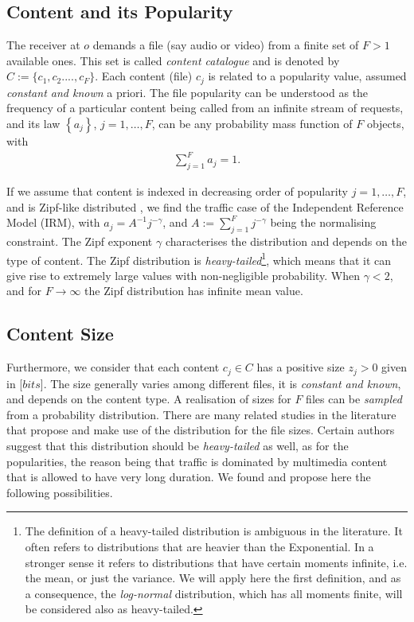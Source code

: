 \documentclass[conference]{IEEEtran}
\begin{document}
\subsection{Content and its Popularity}

The receiver at $o$ demands a file (say audio or video) from a finite set of $F>1$ available ones. This set is called \textit{content catalogue} and is denoted by $\textit{$C$} :=\{c_1,c_2....,c_F\}$. Each content (file) $c_j$ is related to a popularity value, assumed \textit{constant and known} a priori. The file popularity can be understood as the frequency of a particular content being called from an infinite stream of requests, and its law $\left\{a_j\right\}$, $j=1,\ldots,F$, can be any probability mass function of $F$ objects, with
\begin{eqnarray}
\sum_{j=1}^{F} a_j = 1.
\end{eqnarray}

If we assume that content is indexed in decreasing order of popularity  $j=1,\ldots,F$, and is Zipf-like distributed \cite{BreslauINFO99}, we find the traffic case of the Independent Reference Model (IRM), with $a_j=A^{-1}j^{-\gamma}$, and $A:= \sum_{j=1}^{F} j^{-\gamma}$ being the normalising constraint. The Zipf exponent $\gamma$ characterises the distribution and depends on the type of content. The Zipf distribution is \textit{heavy-tailed}\footnote{The definition of a heavy-tailed distribution is ambiguous in the literature. It often refers to distributions that are heavier than the Exponential. In a stronger sense it refers to distributions that have certain moments infinite, i.e. the mean, or just the variance. We will apply here the first definition, and as a consequence, the \textit{log-normal} distribution, which has all moments finite, will be considered also as heavy-tailed.}, which means that it can give rise to extremely large values with non-negligible probability. When $\gamma<2$, and for $F\rightarrow \infty$ the Zipf distribution has infinite mean value. 




\subsection{Content Size}


Furthermore, we consider that each content $c_j\in C$ has a positive size \textit{$z_j>0$} given in [$bits$]. The size generally varies among different files, it is \textit{constant and known}, and depends on the content type. A realisation of sizes for $F$ files can be \textit{sampled} from a probability distribution. There are many related studies in the literature that propose and make use of the distribution for the file sizes. Certain authors suggest that this distribution should be \textit{heavy-tailed} as well, as for the popularities, the reason being that traffic is dominated by multimedia content that is allowed to have very long duration. We found and propose here the following possibilities.
\end{document}
